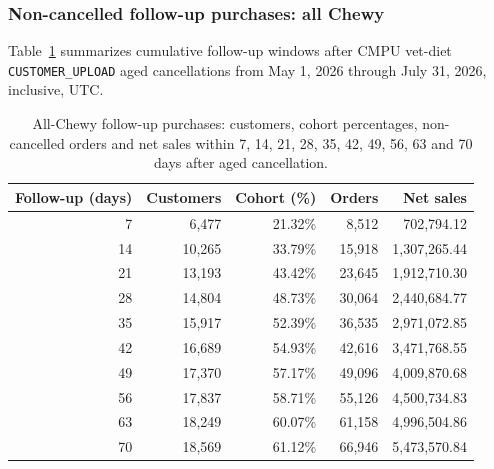 \clearpage
\subsubsection{Non-cancelled follow-up purchases: all Chewy}
Table~\ref{tab:financial-opportunity-reorder-all-chewy} summarizes cumulative
follow-up windows after CMPU vet-diet \texttt{CUSTOMER\_UPLOAD} aged cancellations
from May 1, 2026 through July 31, 2026, inclusive, UTC.

\begin{table}[!htbp]
\centering
\caption{All-Chewy follow-up purchases: customers, cohort percentages, non-cancelled orders and net sales within 7, 14, 21, 28, 35, 42, 49, 56, 63 and 70 days after aged cancellation.}
\label{tab:financial-opportunity-reorder-all-chewy}
\begin{tabular}{@{}rrrrr@{}}
\toprule
Follow-up (days) & Customers & Cohort (\%) & Orders & Net sales \\
\midrule
7 & 6,477 & 21.32\% & 8,512 & 702,794.12 \\
14 & 10,265 & 33.79\% & 15,918 & 1,307,265.44 \\
21 & 13,193 & 43.42\% & 23,645 & 1,912,710.30 \\
28 & 14,804 & 48.73\% & 30,064 & 2,440,684.77 \\
35 & 15,917 & 52.39\% & 36,535 & 2,971,072.85 \\
42 & 16,689 & 54.93\% & 42,616 & 3,471,768.55 \\
49 & 17,370 & 57.17\% & 49,096 & 4,009,870.68 \\
56 & 17,837 & 58.71\% & 55,126 & 4,500,734.83 \\
63 & 18,249 & 60.07\% & 61,158 & 4,996,504.86 \\
70 & 18,569 & 61.12\% & 66,946 & 5,473,570.84 \\
\bottomrule
\end{tabular}


\end{table}
